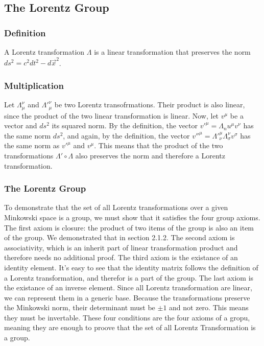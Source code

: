 \documentclass{article}
\begin{document}
\subsection{The Lorentz Group}
\subsubsection{Definition}
A Lorentz transformation $\Lambda$ is a linear transformation that preserves the norm $ds^2 = c^2dt^2 - d\vec{x}^2$.
\subsubsection{Multiplication}
Let $\Lambda_\mu^\nu$ and ${\Lambda'}_\mu^\nu$ be two Lorentz transofrmations. Their product is also linear, since the product of the two linear transformation is linear.
\newline
Now, let $v^\mu$ be a vector and $ds^2$ its squared norm. By the definition, the vector ${v'}^\mu = \Lambda_nu^\mu v^\nu$ has the same norm $ds^2$, and again, by the definition, the vector ${v''}^\mu = {\Lambda'}^\mu_\nu \Lambda^\nu_\sigma v^\sigma$ has the same norm as ${v'}^\mu$ and $v^\mu$. This means that the product of the two transformations $\Lambda' \circ \Lambda$ also preserves the norm and therefore a Lorentz transformation.
\subsubsection{The Lorentz Group}
To demonstrate that the set of all Lorentz transformations over a given Minkowski space is a group, we must show that it satisfies the four group axioms.
\newline
The first axiom is closure: the product of two items of the group is also an item of the group. We demonstrated that in section 2.1.2.
\newline
The second axiom is associativity, which is an inherit part of linear transformation product and therefore needs no additional proof.
\newline
The third axiom is the existance of an identity element. It's easy to see that the identity matrix follows the definition of a Lorentz transformation, and therefor is a part of the group.
\newline
The last axiom is the existance of an inverse element. Since all Lorentz transformation are linear, we can represent them in a generic base. Because the transformations preserve the Minkowski norm, their determinant must be $\pm1$ and not zero. This means they must be invertable.
\newline
These four conditions are the four axioms of a gropu, meaning they are enough to proove that the set of all Lorentz Transformation is a group.
\end{document}
